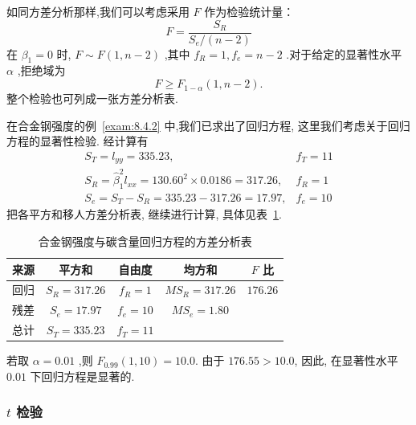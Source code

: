如同方差分析那样,我们可以考虑采用 $F$ 作为检验统计量：
\begin{equation*}
F=\frac{S_{R}}{S_{e} /(n-2)}
\end{equation*}
在 $\beta_1=0$ 时, $F\sim F(1,n-2)$ ,其中 $f_R=1,f_e=n-2$ .对于给定的显著性水平 $\alpha$ ,拒绝域为
\begin{equation*} F\ge F_{1-\alpha}(1,n-2).  \end{equation*}
整个检验也可列成一张方差分析表.
\begin{example}\label{exam:8.4.3}
在合金钢强度的例~\ref{exam:8.4.2} 中,我们已求出了回归方程, 这里我们考虑关于回归方程的显著性检验. 经计算有
\begin{equation*}
\begin{array}{ll}
{S_{T}=l_{y y}=335.23,} & {f_{T}=11} \\ 
{S_{R}=\hat{\beta}_{1}^{2} l_{x x}=130.60^{2} \times 0.0186=317.26,} & {f_{R}=1} \\ {S_{e}=S_{T}-S_{R}=335.23-317.26=17.97,} & {f_{e}=10}
\end{array}
\end{equation*}
把各平方和移人方差分析表, 继续进行计算, 具体见表~\ref{tab:8.4.3}.
\begin{table}[htbp]
  \centering
  \caption{合金钢强度与碳含量回归方程的方差分析表}
  \begin{tabular}{ccccc}
      \toprule
      来源    &  平方和  & 自由度   & 均方和   & $ F$ 比 \\\midrule %
      回归    &  $S_R=317.26$  & $ f_R=1$   &  $MS_R=317.26$  &  $176.26$  \\
      残差    &  $S_e=17.97$  &  $f_e=10$  &  $MS_e=1.80$  &  \\\midrule
      总计    &  $S_T=335.23$  &  $f_T=11$  &       &  \\\bottomrule
  \end{tabular}%
  \label{tab:8.4.3}%
\end{table}%
若取 $\alpha=0.01$ ,则 $F_{0.99}(1,10)=10.0$. 由于 $176.55>10.0$, 因此, 在显著性水平 $0.01$ 下回归方程是显著的.
\end{example}

\subsubsection{$t$ 检验} 


